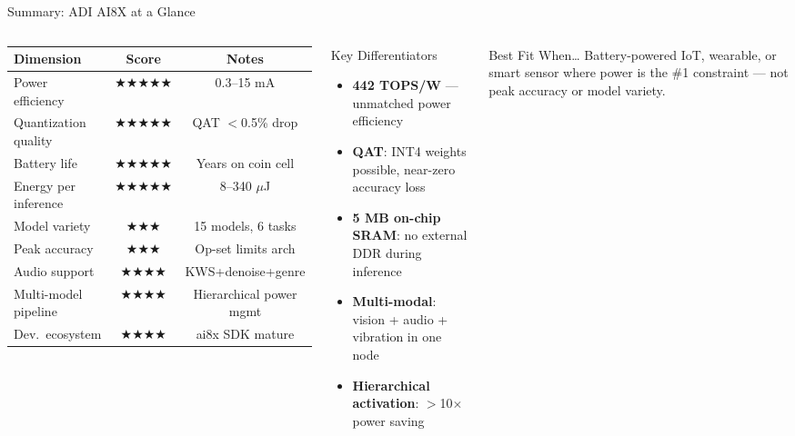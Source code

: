 \documentclass[aspectratio=169]{beamer}
\begin{document}
\begin{frame}{Summary: ADI AI8X at a Glance}
\begin{columns}
\small
\begin{tabular}{lcc}
\toprule
\textbf{Dimension} & \textbf{Score} & \textbf{Notes}\\
\midrule
Power efficiency & $\bigstar\bigstar\bigstar\bigstar\bigstar$ & 0.3--15 mA\\
Quantization quality & $\bigstar\bigstar\bigstar\bigstar\bigstar$ & QAT $<$0.5\% drop\\
Battery life & $\bigstar\bigstar\bigstar\bigstar\bigstar$ & Years on coin cell\\
Energy per inference & $\bigstar\bigstar\bigstar\bigstar\bigstar$ & 8--340 $\mu$J\\
Model variety & $\bigstar\bigstar\bigstar$ & 15 models, 6 tasks\\
Peak accuracy & $\bigstar\bigstar\bigstar$ & Op-set limits arch\\
Audio support & $\bigstar\bigstar\bigstar\bigstar$ & KWS+denoise+genre\\
Multi-model pipeline & $\bigstar\bigstar\bigstar\bigstar$ & Hierarchical power mgmt\\
Dev.\ ecosystem & $\bigstar\bigstar\bigstar\bigstar$ & ai8x SDK mature\\
\bottomrule
\end{tabular}
\begin{block}{Key Differentiators}
\begin{itemize}
  \item \textbf{442 TOPS/W} --- unmatched power efficiency
  \item \textbf{QAT}: INT4 weights possible, near-zero accuracy loss
  \item \textbf{5 MB on-chip SRAM}: no external DDR during inference
  \item \textbf{Multi-modal}: vision + audio + vibration in one node
  \item \textbf{Hierarchical activation}: $>$10$\times$ power saving
\end{itemize}
\end{block}
\begin{alertblock}{Best Fit When\ldots}
\footnotesize Battery-powered IoT, wearable, or smart sensor where power is the \#1 constraint --- not peak accuracy or model variety.
\end{alertblock}
\end{columns}
\end{frame}
\end{document}
